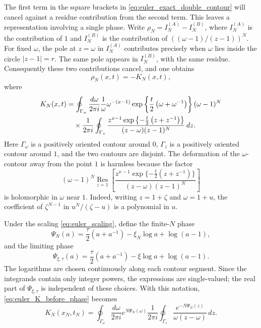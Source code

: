 \documentclass[11pt]{article}
\numberwithin{equation}{section}
\newcommand{\1}{\mathbf 1}
\begin{document}
The first term in the square brackets in
\eqref{eq:euler_exact_double_contour} will cancel against a residue contribution
from the second term.  This leaves a representation involving a single phase.
Write \(\rho_N=I_N^{(A)}-I_N^{(B)}\), where \(I_N^{(A)}\) is the contribution of
\(1\) and \(I_N^{(B)}\) is the contribution of
\(((\omega-1)/(z-1))^N\).  For fixed \(\omega\), the pole at \(z=\omega\) in
\(I_N^{(A)}\) contributes precisely when \(\omega\) lies inside the circle
\(|z-1|=r\).  The same pole appears in \(I_N^{(B)}\), with the same residue.
Consequently these two contributions cancel, and one obtains
\begin{equation}
    \rho_N(x,t)=-K_N(x,t),
    \label{eq:euler_rho_minus_K}
\end{equation}
where
\begin{align}
    K_N(x,t)
    & =
    \oint_{\Gamma_\omega}\frac{d\omega}{2\pi i}
    \frac{1}{\omega}
    \omega^{-(x-1)}
    \exp\left\{\frac{t}{2}\left(\omega+\omega^{-1}\right)\right\}
    (\omega-1)^N
    \notag \\
    &\quad\times
    \frac{1}{2\pi i}
    \oint_{\Gamma_z}
    \frac{
        z^{x-1}
        \exp\left\{-\frac{t}{2}\left(z+z^{-1}\right)\right\}
    }{(z-\omega)(z-1)^N}
    \,dz .
    \label{eq:euler_K_before_phase}
\end{align}
Here \(\Gamma_\omega\) is a positively oriented contour around \(0\),
\(\Gamma_z\) is a positively oriented contour around \(1\), and the two contours
are disjoint.  The deformation of the \(\omega\)-contour away from the point
\(1\) is harmless because the factor
\[
    (\omega-1)^N
    \operatorname*{Res}_{z=1}
    \left[
        \frac{
            z^{x-1}
            \exp\{-\frac{t}{2}(z+z^{-1})\}
        }{(z-\omega)(z-1)^N}
    \right]
\]
is holomorphic in \(\omega\) near \(1\).  Indeed, writing
\(z=1+\zeta\) and \(\omega=1+u\), the coefficient of \(\zeta^{N-1}\) in
\(u^N/(\zeta-u)\) is a polynomial in \(u\).

Under the scaling \eqref{eq:euler_scaling}, define the finite-\(N\) phase
\begin{equation}
    \Psi_N(a)
    =
    \frac{\tau}{2}\left(a+a^{-1}\right)
    -\xi_N\log a
    +\log(a-1),
    \label{eq:euler_phase_N}
\end{equation}
and the limiting phase
\begin{equation}
    \Psi_{\xi,\tau}(a)
    =
    \frac{\tau}{2}\left(a+a^{-1}\right)
    -\xi\log a
    +\log(a-1).
    \label{eq:euler_phase}
\end{equation}
The logarithms are chosen continuously along each contour segment.  Since the
integrands contain only integer powers, the expressions are single-valued; the
real part of \(\Psi_{\xi,\tau}\) is independent of these choices.  With this
notation, \eqref{eq:euler_K_before_phase} becomes
\begin{equation}
    K_N(x_N,t_N)
    =
    \oint_{\Gamma_\omega}\frac{d\omega}{2\pi i}
    e^{N\Psi_N(\omega)}
    \frac{1}{2\pi i}
    \oint_{\Gamma_z}
    \frac{e^{-N\Psi_N(z)}}{\omega(z-\omega)}\,dz .
    \label{eq:euler_K_phase_form}
\end{equation}
\end{document}
